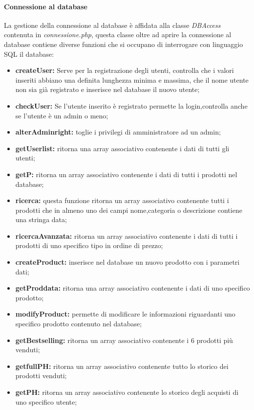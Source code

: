 \paragraph{Connessione al database} \Spazio
La gestione della connessione al database è affidata alla classe \emph{DBAccess} contenuta in \textit{connessione.php}, questa classe oltre ad aprire la connessione al database contiene diverse funzioni che si occupano di interrogare con linguaggio SQL il database:
\begin{itemize}
	\item \textbf{createUser:} Serve per la registrazione degli utenti, controlla che i valori inseriti abbiano una definita lunghezza minima e massima, che il nome utente non sia già registrato e inserisce nel database il nuovo utente;
	\item \textbf{checkUser:} Se l'utente inserito è registrato permette la login,controlla anche se l'utente è un admin o meno;
	\item \textbf{alterAdminright:} toglie i privilegi di amministratore ad un admin;
	\item \textbf{getUserlist:} ritorna una array associativo contenente i dati di tutti gli utenti;
	\item \textbf{getP:} ritorna un array associativo contenente i dati di tutti i prodotti nel database;
	\item \textbf{ricerca:} questa funzione ritorna un array associativo contenente tutti i prodotti che in almeno uno dei campi nome,categoria o descrizione contiene una stringa data; 
	\item \textbf{ricercaAvanzata:} ritorna un array associativo contenente i dati di tutti i prodotti di uno specifico tipo in ordine di prezzo;
	\item \textbf{createProduct:} inserisce nel database un nuovo prodotto con i parametri dati;
	\item \textbf{getProddata:} ritorna una array associativo contenente i dati di uno specifico prodotto;
	\item \textbf{modifyProduct:} permette di modificare le informazioni riguardanti uno specifico prodotto contenuto nel database;
	\item \textbf{getBestselling:} ritorna un array associativo contenente i 6 prodotti più venduti; 
	\item \textbf{getfullPH:} ritorna un array associativo contenente tutto lo storico dei prodotti venduti;
	\item \textbf{getPH:} ritorna un array associativo contenente lo storico degli acquisti di uno specifico utente;

\end{itemize}

